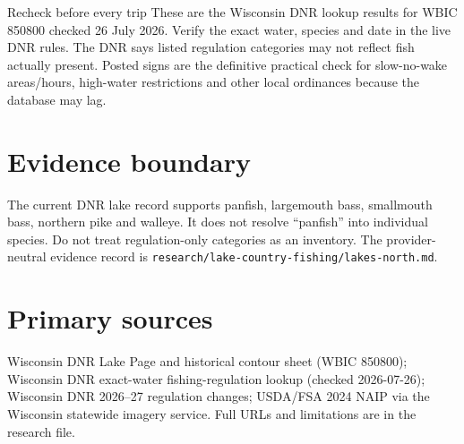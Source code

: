 \begin{teloshazard}{Recheck before every trip}
These are the Wisconsin DNR lookup results for WBIC 850800 checked 26 July
2026. Verify the exact water, species and date in the live DNR rules. The DNR
says listed regulation categories may not reflect fish actually present.
Posted signs are the definitive practical check for slow-no-wake areas/hours,
high-water restrictions and other local ordinances because the database may lag.
\end{teloshazard}

\section{Evidence boundary}

The current DNR lake record supports panfish, largemouth bass, smallmouth bass,
northern pike and walleye. It does not resolve “panfish” into individual
species. Do not treat regulation-only categories as an inventory. The
provider-neutral evidence record is
\texttt{research/lake-country-fishing/lakes-north.md}.

\section{Primary sources}
\small
Wisconsin DNR Lake Page and historical contour sheet (WBIC 850800); Wisconsin
DNR exact-water fishing-regulation lookup (checked 2026-07-26); Wisconsin DNR
2026--27 regulation changes; USDA/FSA 2024 NAIP via the Wisconsin statewide
imagery service. Full URLs and limitations are in the research file.


